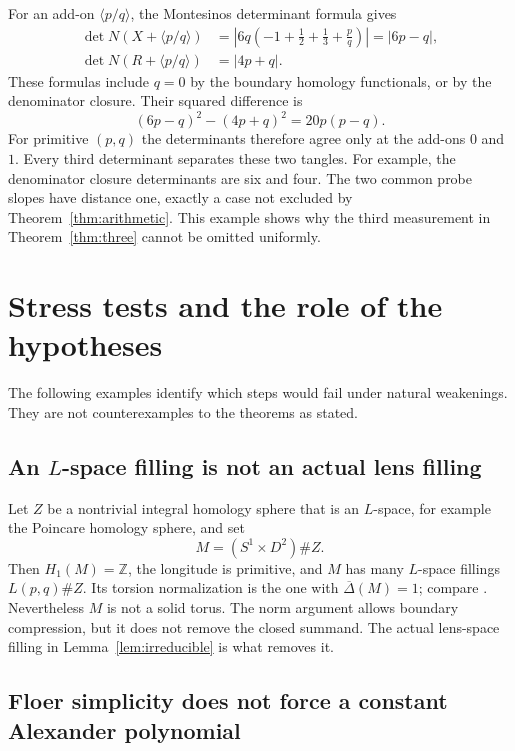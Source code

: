 \documentclass[11pt]{amsart}
\theoremstyle{definition}
\theoremstyle{remark}
\newcommand{\Z}{\mathbb Z}
\newcommand{\Det}{\operatorname{det}}
\newcommand{\tang}[1]{\langle #1\rangle}
\begin{document}
For an add-on \(\tang{p/q}\),
the Montesinos determinant formula
gives
\begin{align}
 \Det N(X+\tang{p/q})
 &=\left|6q\left(-1+\frac12+\frac13+\frac pq\right)\right|
   =|6p-q|,\label{eq:ESX}\\
 \Det N(R+\tang{p/q})&=|4p+q|.\label{eq:ESR}
\end{align}
These formulas include \(q=0\)
by the boundary homology
functionals, or by the
denominator closure. Their
squared difference is
\begin{equation}\label{eq:ESdiff}
 (6p-q)^2-(4p+q)^2=20p(p-q).
\end{equation}
For primitive \((p,q)\) the
determinants therefore agree
only at the add-ons \(0\) and
\(1\). Every third determinant
separates these two tangles.
For example, the denominator
closure determinants are six
and four. The two common
probe slopes have distance
one, exactly a case not
excluded by
Theorem~\ref{thm:arithmetic}.
This example shows why the
third measurement in
Theorem~\ref{thm:three}
cannot be omitted uniformly.

\section{Stress tests and the role of the hypotheses}\label{sec:stress}

The following examples identify
which steps would fail under
natural weakenings. They are
not counterexamples to the
theorems as stated.

\subsection{An \texorpdfstring{\(L\)}{L}-space filling is not an actual lens filling}

Let \(Z\) be a nontrivial
integral homology sphere that
is an \(L\)-space, for example
the Poincare homology sphere,
and set
\[
 M=(S^1\times D^2)\# Z.
\]
Then \(H_1(M)=\Z\), the
longitude is primitive,
and \(M\) has many \(L\)-space
fillings \(L(p,q)\# Z\).
Its torsion normalization is
the one with
\(\overline\Delta(M)=1\);
compare \cite[Section~2.1]{RR}.
Nevertheless \(M\) is not a
solid torus. The norm
argument allows boundary
compression, but it does not
remove the closed summand.
The actual lens-space filling
in Lemma~\ref{lem:irreducible}
is what removes it.

\subsection{Floer simplicity does not force a constant Alexander polynomial}
\end{document}
